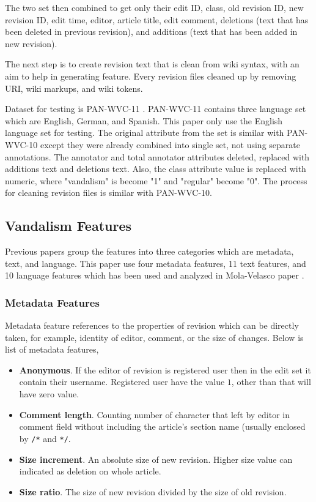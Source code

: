 \documentclass[conference,compsoc,a4paper,twocolumn,final]{IEEEtran}
\begin{document}
The two set then combined to get only their edit ID, class, old revision ID,
new revision ID, edit time, editor, article title, edit comment, deletions
(text that has been deleted in previous revision), and additions (text that
has been added in new revision).

The next step is to create revision text that is clean from wiki syntax, with
an aim to help in generating feature.
Every revision files cleaned up by removing URI, wiki markups, and wiki tokens.

Dataset for testing is PAN-WVC-11 \cite{potthast:2010b}.
PAN-WVC-11 contains three language set which are English, German, and Spanish.
This paper only use the English language set for testing.
The original attribute from the set is similar with PAN-WVC-10 except they were
already combined into single set, not using separate annotations.
The annotator and total annotator attributes deleted, replaced with
additions text and deletions text.
Also, the class attribute value is replaced with numeric, where
"vandalism" is become "1" and "regular" become "0".
The process for cleaning revision files is similar with PAN-WVC-10.


\subsection{Vandalism Features}

Previous papers group the features into three categories which are metadata,
text, and language.
This paper use four metadata features, 11 text features, and 10
language features which has been used and analyzed in Mola-Velasco paper
\cite{mola2012wikipedia}.

\subsubsection{Metadata Features}

Metadata feature references to the properties of revision which can be directly
taken, for example, identity of editor, comment, or the size of changes.
Below is list of metadata features,
\begin{itemize}
\item \textbf{Anonymous}. If the editor of revision is registered user then in
the edit set it contain their username. Registered user have the
value $1$, other than that will have zero value.
\item \textbf{Comment length}. Counting number of character that left by editor
in comment field without including the article's section name (usually enclosed
by \texttt{/*} and \texttt{*/}.
\item \textbf{Size increment}. An absolute size of new revision. Higher size
value can indicated as deletion on whole article.
\item \textbf{Size ratio}. The size of new revision divided by the size of old
revision.
\end{itemize}
\end{document}
